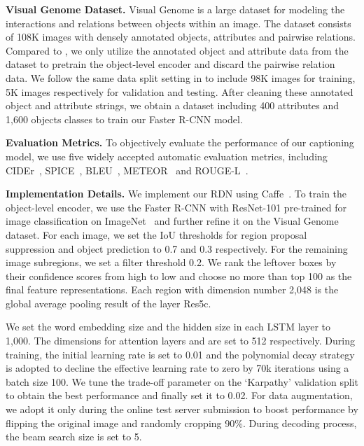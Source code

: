 \documentclass[10pt,twocolumn,letterpaper]{article}
\begin{document}
\smallskip\noindent\textbf{Visual Genome Dataset.}
Visual Genome \cite{krishna2017visual} is a large dataset for modeling the interactions and relations between objects within an image.
The dataset consists of 108K images with densely annotated objects, attributes and pairwise relations.
Compared to \cite{yao2018exploring}, we only utilize the annotated object and attribute data from the dataset to pretrain the object-level encoder and discard the pairwise relation data. 
We follow the same data split setting in \cite{anderson2017bottom} to include 98K images for training, 5K images respectively for validation and testing.
After cleaning these annotated object and attribute strings, we obtain a dataset including 400 attributes and 1,600 objects classes to train our Faster R-CNN model.

\smallskip\noindent\textbf{Evaluation Metrics.}
To objectively evaluate the performance of our captioning model, we use five widely accepted automatic evaluation metrics, including CIDEr~\cite{vedantam2015cider}, SPICE~\cite{anderson2016spice}, BLEU~\cite{papineni2002bleu}, METEOR~\cite{denkowski2014meteor} and ROUGE-L~\cite{lin2004rouge}.



\smallskip\noindent\textbf{Implementation Details.}
We implement our RDN using Caffe~\cite{jia2014caffe}.
To train the object-level encoder, we use the Faster R-CNN with ResNet-101 pre-trained for image classification on ImageNet~\cite{russakovsky2015imagenet} and further refine it on the Visual Genome dataset.
For each image, we set the IoU thresholds for region proposal suppression and object prediction to 0.7 and 0.3 respectively.
For the remaining image subregions, we set a filter threshold 0.2. 
We rank the leftover boxes by their confidence scores from high to low and choose no more than top 100 as the final feature representations.
Each region with dimension number 2,048 is the global average pooling result of the layer Res5c.


We set the word embedding size and the hidden size in each LSTM layer to 1,000.
The dimensions for attention layers  and  are set to 512 respectively.
During training, the initial learning rate is set to 0.01 and the polynomial decay strategy is adopted to decline the effective learning rate to zero by 70k iterations using a batch size 100.
We tune the trade-off parameter  on the `Karpathy' validation split to obtain the best performance and finally set it to 0.02.
For data augmentation, we adopt it only during the online test server submission to boost performance by flipping the original image and randomly cropping 90\%. During decoding process, the beam search size is set to 5.
\end{document}
